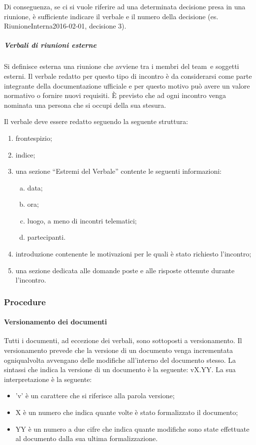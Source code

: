 \documentclass[../NormeProgetto.text]{subfiles}
\begin{document}
			Di conseguenza, se ci si vuole riferire ad una determinata decisione presa in una riunione, è sufficiente indicare il verbale e il numero della decisione (es. RiunioneInterna2016-02-01, decisione 3).

			\subparagraph{Verbali di riunioni esterne}
				Si definisce esterna una riunione che avviene tra i membri del team\g\ e soggetti esterni. Il verbale redatto per questo tipo di incontro è da considerarsi come parte integrante della documentazione ufficiale e per questo motivo può avere un valore normativo o fornire nuovi requisiti. È previsto che ad ogni incontro venga nominata una persona che si occupi della sua stesura.
			
				Il verbale deve essere redatto seguendo la seguente struttura:
				\begin{enumerate}
					\item frontespizio;
					\item indice;
					\item una sezione ``Estremi del Verbale'' contente le seguenti informazioni:
					\begin{enumerate}[a.]
						\item data;
						\item ora;
						\item luogo, a meno di incontri telematici;
						\item partecipanti.
					\end{enumerate}
					\item introduzione contenente le motivazioni per le quali è stato richiesto l'incontro;
					\item una sezione dedicata alle domande poste e alle risposte ottenute durante l'incontro.
				\end{enumerate}
		\subsubsection{Procedure}	
			\paragraph{Versionamento dei documenti} \label{sec:Versionamento dei documenti}
				Tutti i documenti, ad eccezione dei verbali, sono sottoposti a versionamento. Il versionamento prevede che la versione di un documento venga incrementata ogniqualvolta avvengano delle modifiche all'interno del documento stesso.
				La sintassi che indica la versione di un documento è la seguente: vX.YY. La sua interpretazione è la seguente:
				\begin{itemize}
					\item 'v' è un carattere che si riferisce alla parola versione;
					\item X è un numero che indica quante volte è stato formalizzato il documento;
					\item YY è un numero a due cifre che indica quante modifiche sono state effettuate al documento dalla sua ultima formalizzazione.
				\end{itemize}
\end{document}
